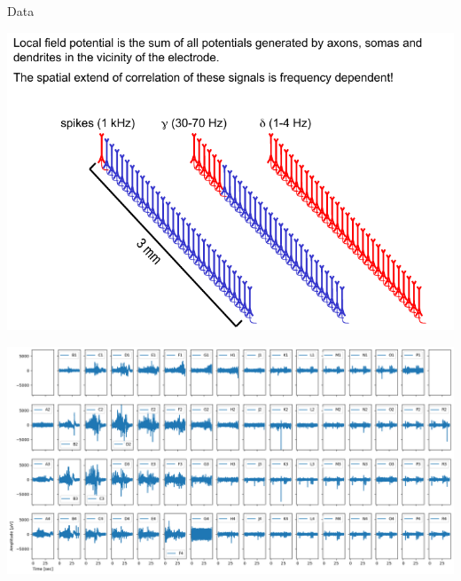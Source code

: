 \documentclass[10pt]{beamer}
\begin{document}
\begin{frame}[allowframebreaks]{Data}
\begin{center}
  \includegraphics[keepaspectratio,width=0.8\framewidth]{img/2_lfp_origins.png}
 \end{center}
  \framebreak
 \begin{center}
  \includegraphics[keepaspectratio,width=\framewidth]{img/4_raw.png}
 \end{center}
\end{frame}
\end{document}
